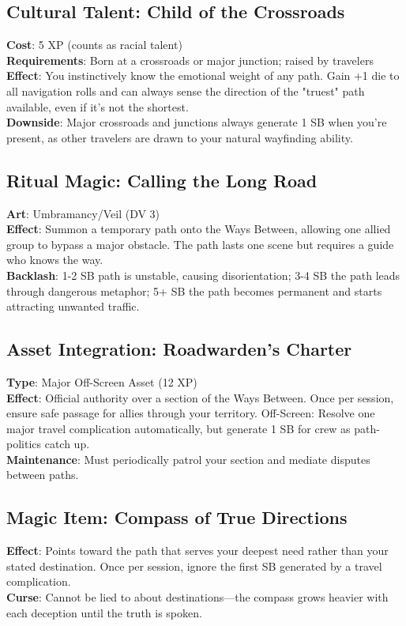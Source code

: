\subsection*{Cultural Talent: Child of the Crossroads}
\textbf{Cost}: 5 XP (counts as racial talent) \\
\textbf{Requirements}: Born at a crossroads or major junction; raised by travelers \\
\textbf{Effect}: You instinctively know the emotional weight of any path. Gain +1 die to all navigation rolls and can always sense the direction of the "truest" path available, even if it's not the shortest. \\
\textbf{Downside}: Major crossroads and junctions always generate 1 SB when you're present, as other travelers are drawn to your natural wayfinding ability.

\subsection*{Ritual Magic: Calling the Long Road}
\textbf{Art}: Umbramancy/Veil (DV 3) \\
\textbf{Effect}: Summon a temporary path onto the Ways Between, allowing one allied group to bypass a major obstacle. The path lasts one scene but requires a guide who knows the way. \\
\textbf{Backlash}: 1-2 SB path is unstable, causing disorientation; 3-4 SB the path leads through dangerous metaphor; 5+ SB the path becomes permanent and starts attracting unwanted traffic.

\subsection*{Asset Integration: Roadwarden's Charter}
\textbf{Type}: Major Off-Screen Asset (12 XP) \\
\textbf{Effect}: Official authority over a section of the Ways Between. Once per session, ensure safe passage for allies through your territory. Off-Screen: Resolve one major travel complication automatically, but generate 1 SB for crew as path-politics catch up. \\
\textbf{Maintenance}: Must periodically patrol your section and mediate disputes between paths.

\subsection*{Magic Item: Compass of True Directions}
\textbf{Effect}: Points toward the path that serves your deepest need rather than your stated destination. Once per session, ignore the first SB generated by a travel complication. \\
\textbf{Curse}: Cannot be lied to about destinations---the compass grows heavier with each deception until the truth is spoken.

